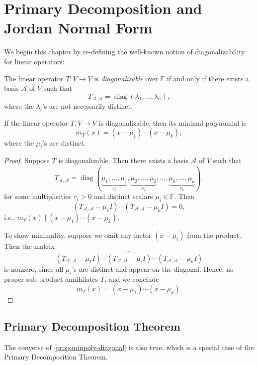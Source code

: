 \chapter{Primary Decomposition and Jordan Normal Form}

We begin this chapter by re-defining the well-known notion of diagonalizability for linear operators:
\begin{definition}[Diagonalizable]\label{def:diagonalizable}
The linear operator \( T : V \to V \) is \emph{diagonalizable} over \( \mathbb{F} \) if and only if there exists a basis \( \mathcal{A} \) of \( V \) such that
\[
T_{\mathcal{A}, \mathcal{A}} = \operatorname{diag}(\lambda_1, \ldots, \lambda_n),
\]
where the \( \lambda_i \)'s are not necessarily distinct.
\end{definition}

\begin{proposition}\label{prop:minpoly-diagonal}
If the linear operator \( T : V \to V \) is diagonalizable, then its minimal polynomial is
\[
m_T(x) = (x - \mu_1)\cdots(x - \mu_k),
\]
where the \( \mu_i \)'s are distinct.
\end{proposition}

\begin{proof}
Suppose \( T \) is diagonalizable. Then there exists a basis \( \mathcal{A} \) of \( V \) such that
\[
T_{\mathcal{A}, \mathcal{A}} = \operatorname{diag}(\underbrace{\mu_1, \ldots, \mu_1}_{r_1}, \underbrace{\mu_2, \ldots, \mu_2}_{r_2}, \ldots, \underbrace{\mu_k, \ldots, \mu_k}_{r_k}),
\]
for some multiplicities \( r_i > 0 \) and distinct scalars \( \mu_i \in \mathbb{F} \). Then
\[
\left( T_{\mathcal{A}, \mathcal{A}} - \mu_1 I \right)\cdots\left( T_{\mathcal{A}, \mathcal{A}} - \mu_k I \right) = 0,
\]
i.e., \( m_T(x) \mid (x - \mu_1)\cdots(x - \mu_k) \).

To show minimality, suppose we omit any factor \( (x - \mu_i) \) from the product. Then the matrix
\[
\left( T_{\mathcal{A}, \mathcal{A}} - \mu_1 I \right)\cdots \widehat{(T_{\mathcal{A}, \mathcal{A}} - \mu_iI)} \cdots \left( T_{\mathcal{A}, \mathcal{A}} - \mu_k I \right)
\]
is nonzero, since all \( \mu_i \)'s are distinct and appear on the diagonal. Hence, no proper sub-product annihilates \( T \), and we conclude
\[
m_T(x) = (x - \mu_1)\cdots(x - \mu_k).
\]
\end{proof}

\section{Primary Decomposition Theorem}
The converse of \autoref{prop:minpoly-diagonal} is also true, which is a special case of the Primary Decomposition Theorem.

